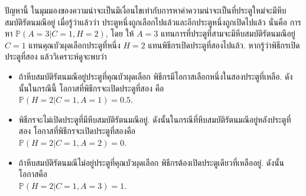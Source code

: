 ปัญหานี้ ในมุมมองของความน่าจะเป็นมีเงื่อนไขเท่ากับการหาค่าความน่าจะเป็นที่ประตูใหม่จะมีหีบสมบัติรัตนมณีอยู่ 
เมื่อรู้ว่าแล้วว่า ประตูหนึ่งถูกเลือกไปแล้วและอีกประตูหนึ่งถูกเปิดไปแล้ว
นั่นคือ การหา $\mathbb{P}(A = 3|C = 1, H = 2)$,
โดย ให้ $A = 3$ แทนการที่ประตูที่สามจะมีหีบสมบัติรัตนมณีอยู่
$C = 1$ แทนคุณบัวผุดเลือกประตูที่หนึ่ง 
$H = 2$ แทนพิธีกรเปิดประตูที่สองไปแล้ว.
หากรู้ว่าพิธีกรเปิดประตูที่สอง แล้ววิเคราะห์ดูจะพบว่า
\begin{itemize}
\item ถ้าหีบสมบัติรัตนมณีอยู่ประตูที่คุณบัวผุดเลือก พิธีกรมีโอกาสเลือกหนึ่งในสองประตูที่เหลือ.
ดังนั้นในกรณีนี้ โอกาสที่พิธีกรจะเปิดประตูที่สอง คือ
\\ $\mathbb{P}(H = 2| C = 1, A = 1) = 0.5$.
\item พิธีกรจะไม่เปิดประตูที่มีหีบสมบัติรัตนมณีอยู่.
ดังนั้นในกรณีที่หีบสมบัติรัตนมณีอยู่หลังประตูที่สอง โอกาสที่พิธีกรจะเปิดประตูที่สองคือ
\\ $\mathbb{P}(H = 2| C = 1, A = 2) = 0$.
\item ถ้าหีบสมบัติรัตนมณีไม่อยู่ประตูที่คุณบัวผุดเลือก พิธีกรต้องเปิดประตูเดียวที่เหลืออยู่.
ดังนั้น โอกาสคือ
\\ $\mathbb{P}(H = 2| C = 1, A = 3) = 1$.
\end{itemize}

